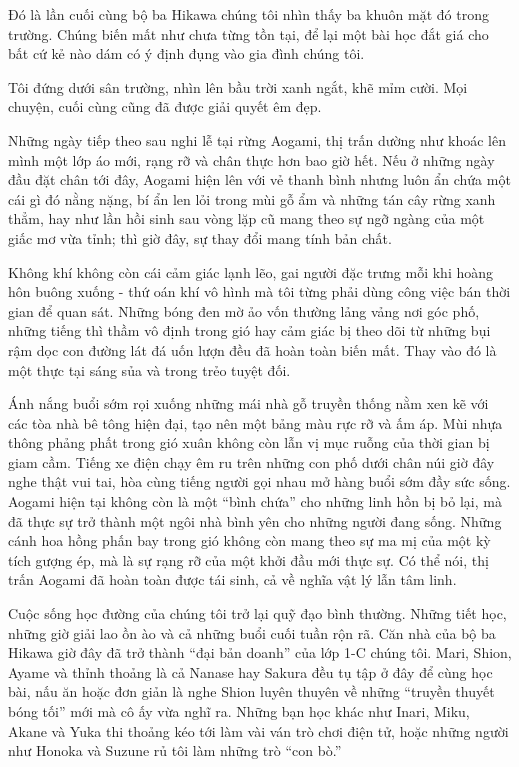 \documentclass[../main.tex]{subfiles}
\begin{document}
Đó là lần cuối cùng bộ ba Hikawa chúng tôi nhìn thấy ba khuôn mặt đó trong trường. Chúng biến mất như chưa từng tồn tại, để lại một bài học đắt giá cho bất cứ kẻ nào dám có ý định đụng vào gia đình chúng tôi.

Tôi đứng dưới sân trường, nhìn lên bầu trời xanh ngắt, khẽ mỉm cười. Mọi chuyện, cuối cùng cũng đã được giải quyết êm đẹp.

\ct

Những ngày tiếp theo sau nghi lễ tại rừng Aogami, thị trấn dường như khoác lên mình một lớp áo mới, rạng rỡ và chân thực hơn bao giờ hết. Nếu ở những ngày đầu đặt chân tới đây, Aogami hiện lên với vẻ thanh bình nhưng luôn ẩn chứa một cái gì đó nằng nặng, bí ẩn len lỏi trong mùi gỗ ẩm và những tán cây rừng xanh thẳm, hay như lần hồi sinh sau vòng lặp cũ mang theo sự ngỡ ngàng của một giấc mơ vừa tỉnh; thì giờ đây, sự thay đổi mang tính bản chất.

Không khí không còn cái cảm giác lạnh lẽo, gai người đặc trưng mỗi khi hoàng hôn buông xuống - thứ oán khí vô hình mà tôi từng phải dùng công việc bán thời gian để quan sát. Những bóng đen mờ ảo vốn thường lảng vảng nơi góc phố, những tiếng thì thầm vô định trong gió hay cảm giác bị theo dõi từ những bụi rậm dọc con đường lát đá uốn lượn đều đã hoàn toàn biến mất. Thay vào đó là một thực tại sáng sủa và trong trẻo tuyệt đối.

Ánh nắng buổi sớm rọi xuống những mái nhà gỗ truyền thống nằm xen kẽ với các tòa nhà bê tông hiện đại, tạo nên một bảng màu rực rỡ và ấm áp. Mùi nhựa thông phảng phất trong gió xuân không còn lẫn vị mục ruỗng của thời gian bị giam cầm. Tiếng xe điện chạy êm ru trên những con phố dưới chân núi giờ đây nghe thật vui tai, hòa cùng tiếng người gọi nhau mở hàng buổi sớm đầy sức sống. Aogami hiện tại không còn là một ``bình chứa'' cho những linh hồn bị bỏ lại, mà đã thực sự trở thành một ngôi nhà bình yên cho những người đang sống. Những cánh hoa hồng phấn bay trong gió không còn mang theo sự ma mị của một kỳ tích gượng ép, mà là sự rạng rỡ của một khởi đầu mới thực sự. Có thể nói, thị trấn Aogami đã hoàn toàn được tái sinh, cả về nghĩa vật lý lẫn tâm linh.

Cuộc sống học đường của chúng tôi trở lại quỹ đạo bình thường. Những tiết học, những giờ giải lao ồn ào và cả những buổi cuối tuần rộn rã. Căn nhà của bộ ba Hikawa giờ đây đã trở thành ``đại bản doanh'' của lớp 1-C chúng tôi. Mari, Shion, Ayame và thỉnh thoảng là cả Nanase hay Sakura đều tụ tập ở đây để cùng học bài, nấu ăn hoặc đơn giản là nghe Shion luyên thuyên về những ``truyền thuyết bóng tối'' mới mà cô ấy vừa nghĩ ra. Những bạn học khác như Inari, Miku, Akane và Yuka thi thoảng kéo tới làm vài ván trò chơi điện tử, hoặc những người như Honoka và Suzune rủ tôi làm những trò ``con bò.''
\end{document}
